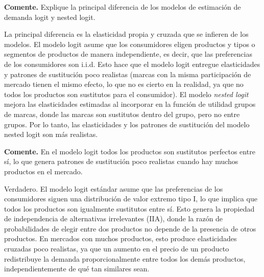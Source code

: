 \question \textbf{Comente.} Explique la principal diferencia de los modelos de estimación de demanda logit y nested logit.
\begin{solution}
La principal diferencia es la elasticidad propia y cruzada que se infieren de los modelos. El modelo logit asume que los consumidores eligen productos y tipos o segmentos de productos de manera independiente, es decir, que las preferencias de los consumidores son i.i.d. Esto hace que el modelo logit entregue elasticidades y patrones de sustitución poco realistas (marcas con la misma participación de mercado tienen el mismo efecto, lo que no es cierto en la realidad, ya que no todos los productos son sustitutos para el consumidor). El modelo \emph{nested logit} mejora las elasticidades estimadas al incorporar en la función de utilidad grupos de marcas, donde las marcas son sustitutos dentro del grupo, pero no entre grupos. Por lo tanto, las elasticidades y los patrones de sustitución del modelo nested logit son más realistas.

\end{solution}

\question \textbf{Comente.} En el modelo logit todos los productos son sustitutos perfectos entre sí, lo que genera patrones de sustitución poco realistas cuando hay muchos productos en el mercado.
\begin{solution}
Verdadero. El modelo logit estándar asume que las preferencias de los consumidores siguen una distribución de valor extremo tipo I, lo que implica que todos los productos son igualmente sustitutos entre sí. Esto genera la propiedad de independencia de alternativas irrelevantes (IIA), donde la razón de probabilidades de elegir entre dos productos no depende de la presencia de otros productos. En mercados con muchos productos, esto produce elasticidades cruzadas poco realistas, ya que un aumento en el precio de un producto redistribuye la demanda proporcionalmente entre todos los demás productos, independientemente de qué tan similares sean.

\end{solution}

